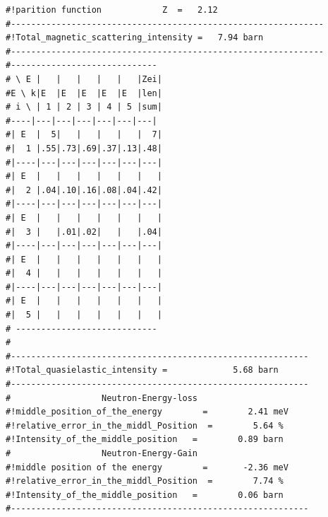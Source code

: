 \begin{enumerate}
{\begin{verbatim}
#!parition function            Z  =   2.12                 
#-------------------------------------------------------------- 
#!Total_magnetic_scattering_intensity =   7.94 barn            
#-------------------------------------------------------------- 
#----------------------------- 
# \ E |   |   |   |   |   |Zei|
#E \ k|E  |E  |E  |E  |E  |len|
# i \ | 1 | 2 | 3 | 4 | 5 |sum|
#----|---|---|---|---|---|---|
#| E  |  5|   |   |   |   |  7|
#|  1 |.55|.73|.69|.37|.13|.48|
#|----|---|---|---|---|---|---|
#| E  |   |   |   |   |   |   |
#|  2 |.04|.10|.16|.08|.04|.42|
#|----|---|---|---|---|---|---|
#| E  |   |   |   |   |   |   |
#|  3 |   |.01|.02|   |   |.04|
#|----|---|---|---|---|---|---|
#| E  |   |   |   |   |   |   |
#|  4 |   |   |   |   |   |   |
#|----|---|---|---|---|---|---|
#| E  |   |   |   |   |   |   |
#|  5 |   |   |   |   |   |   |
# ---------------------------- 
#
#-----------------------------------------------------------
#!Total_quasielastic_intensity =             5.68 barn           
#-----------------------------------------------------------
#                  Neutron-Energy-loss                      
#!middle_position_of_the_energy        =        2.41 meV    
#!relative_error_in_the_middl_Position  =        5.64 %      
#!Intensity_of_the_middle_position   =        0.89 barn   
#                  Neutron-Energy-Gain                 
#!middle position of the energy        =       -2.36 meV    
#!relative_error_in_the_middl_Position  =        7.74 %      
#!Intensity_of_the_middle_position   =        0.06 barn   
#-----------------------------------------------------------


\end{verbatim}}
\end{enumerate}
